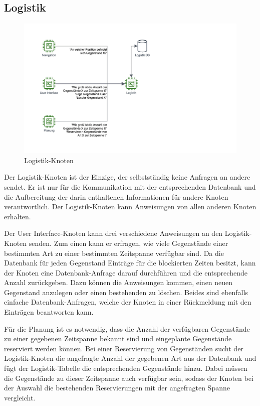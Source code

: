 \FloatBarrier
\newpage \subsection{Logistik}

\begin{figure}[h]
\centering
\includegraphics[width=\textwidth]{Bilder/3_Logistik.png}
\caption{Logistik-Knoten}
\end{figure}

Der Logistik-Knoten ist der Einzige, der selbstständig keine Anfragen an andere sendet. Er ist nur für die Kommunikation mit der entsprechenden Datenbank und die Aufbereitung der darin enthaltenen Informationen für andere Knoten verantwortlich. Der Logistik-Knoten kann Anweisungen von allen anderen Knoten erhalten.

Der User Interface-Knoten kann drei verschiedene Anweisungen an den Logistik-Knoten senden. Zum einen kann er erfragen, wie viele Gegenstände einer bestimmten Art zu einer bestimmten Zeitspanne verfügbar sind. Da die Datenbank für jeden Gegenstand Einträge für die blockierten Zeiten besitzt, kann der Knoten eine Datenbank-Anfrage darauf durchführen und die entsprechende Anzahl zurückgeben. Dazu können die Anweisungen kommen, einen neuen Gegenstand anzulegen oder einen bestehenden zu löschen. Beides sind ebenfalls einfache Datenbank-Anfragen, welche der Knoten in einer Rückmeldung mit den Einträgen beantworten kann.

Für die Planung ist es notwendig, dass die Anzahl der verfügbaren Gegenstände zu einer gegebenen Zeitspanne bekannt sind und eingeplante Gegenstände reserviert werden können. Bei einer Reservierung von Gegenständen sucht der Logistik-Knoten die angefragte Anzahl der gegebenen Art aus der Datenbank und fügt der Logistik-Tabelle die entsprechenden Gegenstände hinzu. Dabei müssen die Gegenstände zu dieser Zeitspanne auch verfügbar sein, sodass der Knoten bei der Auswahl die bestehenden Reservierungen mit der angefragten Spanne vergleicht.

